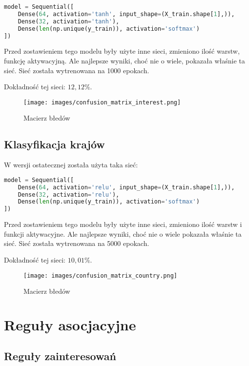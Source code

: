 \documentclass[12pt,a4paper]{article}
\begin{document}
\begin{lstlisting}[language=Python]
model = Sequential([
    Dense(64, activation='tanh', input_shape=(X_train.shape[1],)),
    Dense(32, activation='tanh'),
    Dense(len(np.unique(y_train)), activation='softmax')
])
\end{lstlisting}

Przed zostawieniem tego modelu były użyte inne sieci, zmieniono ilość warstw, funkcję aktywacyjną. Ale najlepsze wyniki, choć nie o wiele, pokazała właśnie ta sieć. Sieć została wytrenowana na 1000 epokach.

Dokładność tej sieci: $12,12\%$.

\begin{figure}[h]
    \centering
    \texttt{[image: images/confusion\_matrix\_interest.png]}
    \caption{Macierz błedów}
    \label{fig:cm_int}
\end{figure}

\subsection{Klasyfikacja krajów}
W wersji ostatecznej została użyta taka sieć:

\begin{lstlisting}[language=Python]
model = Sequential([
    Dense(64, activation='relu', input_shape=(X_train.shape[1],)),
    Dense(32, activation='relu'),
    Dense(len(np.unique(y_train)), activation='softmax')
])

\end{lstlisting}

Przed zostawieniem tego modelu były użyte inne sieci, zmieniono ilość warstw i funkcji aktywacyjne. Ale najlepsze wyniki, choć nie o wiele pokazała właśnie ta sieć. Sieć została wytrenowana na 5000 epokach.

Dokładność tej sieci: $10,01\%$.

\begin{figure}[h]
    \centering
    \texttt{[image: images/confusion\_matrix\_country.png]}
    \caption{Macierz błedów}
    \label{fig:cm_c}
\end{figure}

\newpage

\section{Reguły asocjacyjne}

\subsection{Reguły zainteresowań}
\end{document}
